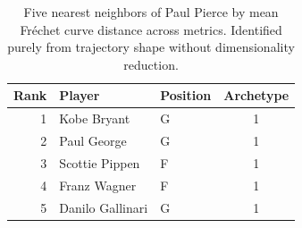 \begin{table}[htbp]
  \centering\small
  \begin{tabular}{rllc}
    \toprule
    Rank & Player & Position & Archetype \\
    \midrule
    1 & Kobe Bryant & G & 1 \\
    2 & Paul George & G & 1 \\
    3 & Scottie Pippen & F & 1 \\
    4 & Franz Wagner & F & 1 \\
    5 & Danilo Gallinari & G & 1 \\
    \bottomrule
  \end{tabular}
  \caption{Five nearest neighbors of Paul Pierce by mean Fr\'{e}chet curve distance across metrics. Identified purely from trajectory shape without dimensionality reduction.}
  \label{tab:Paul_Pierce_frechet_curve_neighbors}
\end{table}

